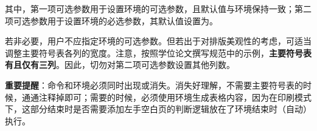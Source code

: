 \documentclass[print, promaster, vlined]{DissertUESTC}
\begin{document}
	\noindent 其中，第一项可选参数用于设置环境的可选参数，且默认值与环境保持一致；第二项可选参数用于设置环境的必选参数，其默认值设置为。
	
	若非必要，用户不应指定环境的可选参数。但若出于对排版美观性的考虑，可适当调整主要符号表各列的宽度。注意，按照学位论文撰写规范中的示例，\textbf{主要符号表有且仅有三列}。因此，切勿对第二项可选参数设置其他列数。
	
	\textbf{重要提醒}：命令和环境必须同时出现或消失。消失好理解，不需要主要符号表的时候，通通注释掉即可；需要的时候，必须使用环境生成表格内容，因为在印刷模式下，这部分结束时是否需要添加左手空白页的判断逻辑放在了环境结束时（自动）执行。
	
\end{document}
